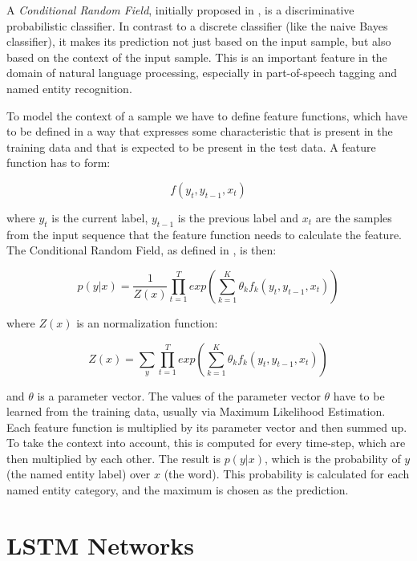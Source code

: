 \documentclass[12pt]{book}
\begin{document}
	A \textit{Conditional Random Field}, initially proposed in \cite{lafferty2001conditional}, is a discriminative probabilistic classifier. In contrast to a discrete classifier (like the naive Bayes classifier), it makes its prediction not just based on the input sample, but also based on the context of the input sample. This is an important feature in the domain of natural language processing, especially in part-of-speech tagging and named entity recognition. 
	
	To model the context of a sample we have to define feature functions, which have to be defined in a way that expresses some characteristic that is present in the training data and that is expected to be present in the test data. A feature function has to form:
	
	\begin{equation}
	f(y_t, y_{t-1}, x_t)
	\end{equation}
	
	where $y_t$ is the current label, $y_{t-1}$ is the previous label and $x_t$ are the samples from the input sequence that the feature function needs to calculate the feature. The Conditional Random Field, as defined in \cite{MAL-013}, is then:
	
	\begin{equation}
	p(y|x) = \frac{1}{Z(x)} \prod_{t=1}^T exp(\sum_{k=1}^{K} \theta_k f_k(y_t, y_{t-1}, x_t))
	\end{equation}
	
	where $Z(x)$ is an normalization function:
	
	\begin{equation}
	Z(x) = \sum_{y} \prod_{t=1}^{T} exp(\sum_{k=1}^{K} \theta_k f_k(y_t, y_{t-1}, x_t))
	\end{equation}
	
	and $\theta$ is a parameter vector. The values of the parameter vector $\theta$ have to be learned from the training data, usually via Maximum Likelihood Estimation. Each feature function is multiplied by its parameter vector and then summed up. To take the context into account, this is computed for every time-step, which are then multiplied by each other. The result is $p(y|x)$, which is the probability of $y$ (the named entity label) over $x$ (the word). This probability is calculated for each named entity category, and the maximum is chosen as the prediction.
	
	\section{LSTM Networks}
	\label{sec:lstm}
	
\end{document}

